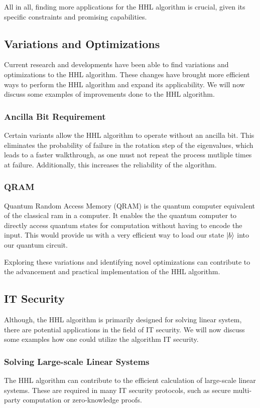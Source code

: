 All in all, finding more applications for the HHL algorithm is crucial, given its specific constraints and promising capabilities.

\subsection{Variations and Optimizations}
Current research and developments have been able to find variations and optimizations to the HHL algorithm.
These changes have brought more efficient ways to perform the HHL algorithm and expand its applicability.
We will now discuss some examples of improvements done to the HHL algorithm.

    \subsubsection{Ancilla Bit Requirement} 
    Certain variants allow the HHL algorithm to operate without an ancilla bit.
    This eliminates the probability of failure in the rotation step of the eigenvalues, which leads to a faster walkthrough, as one must not repeat the process mutliple times at failure.
    Additionally, this increases the reliability of the algorithm.

    \subsubsection{QRAM}
    Quantum Random Access Memory (QRAM) is the quantum computer equivalent of the classical ram in a computer.
    It enables the the quantum computer to directly access quantum states for computation without having to encode the input. 
    This would provide us with a very efficient way to load our state $\ket b$ into our quantum circuit.

Exploring these variations and identifying novel optimizations can contribute to the advancement and practical implementation of the HHL algorithm.


\subsection{IT Security}
Although, the HHL algorithm is primarily designed for solving linear system, there are potential applications in the field of IT security.
We will now discuss some examples how one could utilize the algorithm IT security.

    \subsubsection{Solving Large-scale Linear Systems}
    The HHL algorithm can contribute to the efficient calculation of large-scale linear systems.
    These are required in many IT security protocols, such as secure multi-party computation or zero-knowledge proofs. 

